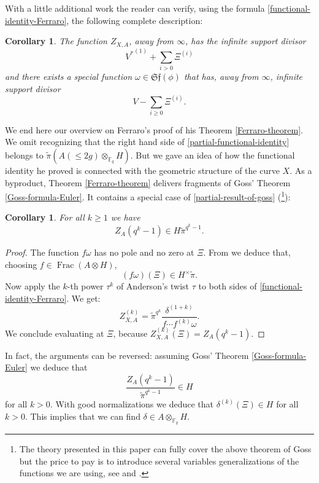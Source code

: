 \documentclass[11pt]{amsart}
\numberwithin{equation}{section}
\newcommand{\FF}{\mathbb{F}}
\newtheorem{Corollary}[Theorem]{Corollary}
\begin{document}
With a little additional work the reader can verify, using the formula \eqref{functional-identity-Ferraro}, the following complete description: 
\begin{Corollary}\label{Corollary-precise-divisors}
The function $Z_{X,A}$, away from $\infty$, has the infinite support divisor $${V^*}^{(1)}+\sum_{i>0}\Xi^{(i)}$$ and there exists a special function $\omega\in\mathfrak{Sf}(\phi)$ that has, away from $\infty$, infinite support divisor $${V}-\sum_{i\geq 0}\Xi^{(i)}.$$
\end{Corollary}

We end here our overview on Ferraro's proof of his Theorem \ref{Ferraro-theorem}. We omit recognizing that the 
right hand side of \eqref{partial-functional-identity} belongs to $\widetilde{\pi}(A(\leq 2g)\otimes_{\FF_q} H)$. But we gave an idea of how the functional identity he proved is connected with the geometric structure of the curve $X$. As a byproduct, 
Theorem \ref{Ferraro-theorem} delivers fragments of Goss' Theorem \ref{Goss-formula-Euler}. It contains a special case of 
\eqref{partial-result-of-goss} (\footnote{The theory presented in this paper can fully cover the above theorem of Goss but the price to pay is to introduce several variables generalizations of the functions we are using, see \cite{ANG&PEL} and \cite{ANG&NGO&TAV1}.}):

\begin{Corollary}
For all $k\geq1$ we have 
$$Z_{A}(q^k-1)\in H\widetilde{\pi}^{q^k-1}.$$
\end{Corollary}

\begin{proof}
The function $f\omega$ has no pole and no zero at $\Xi$.
From \cite[Theorem 5.8]{GAZ&MAU2} we deduce that, choosing $f\in\operatorname{Frac}(A\otimes H)$, 
$$(f\omega)(\Xi)\in H^\times\widetilde{\pi}.$$ Now apply the $k$-th power $\tau^k$ of Anderson's twist $\tau$ to both sides 
of \eqref{functional-identity-Ferraro}. We get:
$$Z^{(k)}_{X,A}=\widetilde{\pi}^{q^k}\frac{\delta^{(1+k)}}{f\cdots f^{(k)}\omega}.$$
We conclude evaluating at $\Xi$, because $Z^{(k)}_{X,A}(\Xi)=Z_A(q^k-1)$.
\end{proof}

In fact, the arguments can be reversed: assuming Goss' Theorem \ref{Goss-formula-Euler} we deduce that 
$$\frac{Z_{A}(q^k-1)}{\widetilde{\pi}^{q^k-1}}\in H$$ for all $k>0$. With good normalizations we deduce that 
$\delta^{(k)}(\Xi)\in H$ for all $k>0$. This implies that we can find $\delta\in A\otimes_{\FF_q} H$.
\end{document}
